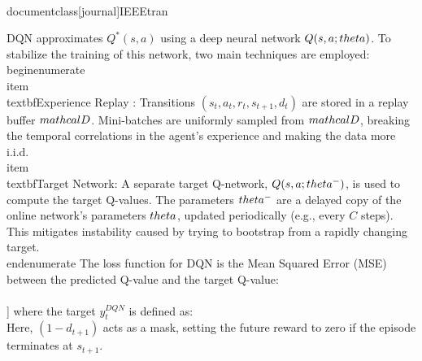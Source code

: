 \\documentclass[journal]{IEEEtran}
\begin{document}
DQN approximates $Q^*(s, a)$ using a deep neural network $Q(s, a; \\theta)$. To stabilize the training of this network, two main techniques are employed:
\\begin{enumerate}
    \\item \\textbf{Experience Replay} \cite{lin1992self}: Transitions $(s_t, a_t, r_t, s_{t+1}, d_t)$ are stored in a replay buffer $\\mathcal{D}$. Mini-batches are uniformly sampled from $\\mathcal{D}$, breaking the temporal correlations in the agent's experience and making the data more i.i.d.
    \\item \\textbf{Target Network}: A separate target Q-network, $Q(s, a; \\theta^-)$, is used to compute the target Q-values. The parameters $\\theta^-$ are a delayed copy of the online network's parameters $\\theta$, updated periodically (e.g., every $C$ steps). This mitigates instability caused by trying to bootstrap from a rapidly changing target.
\\end{enumerate}
The loss function for DQN is the Mean Squared Error (MSE) between the predicted Q-value and the target Q-value:
\\[
L(\\theta) = \\mathbb{E}_{(s,a,r,s\',d) \\sim U(\\mathcal{D})} \\left[ \\left( y_t^{DQN} - Q(s_t, a_t; \\theta) \\right)^2 \\right]
\\]
where the target $y_t^{DQN}$ is defined as:
\\[
y_t^{DQN} = r_{t+1} + \\gamma \\max_{a\'} Q(s_{t+1}, a\'; \\theta^-) (1 - d_{t+1})
\\]
Here, $(1 - d_{t+1})$ acts as a mask, setting the future reward to zero if the episode terminates at $s_{t+1}$.
\end{document}
